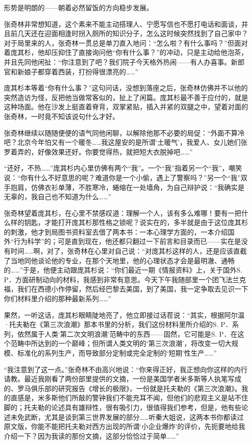 \par 形势是明朗的——朝着必然留饭的方向稳步发展。
\par 张奇林非常想知道，这个素来不能主动搭理人、宁愿写信也不愿打电话和面谈，并且前几天还在迎面相逢时拐入厕所的知识分子，怎么这时候突然找到了自己家中？对于局里来的人，张奇林一贯总是单刀直入地问：“怎么啦？有什么事吗？”但面对着庞其杉，他却压抑住了直接询问他“你有什么事？”的冲动，只是主动给他泡茶，并且先同他闲扯：“你注意到了吧？我们院子今天格外热闹——有人办喜事。新郎官和新娘子都穿着西装，打扮得很漂亮的……”
\par 庞其杉本等着“你有什么事？”这句问话，没想到落座之后，张奇林仿佛并不以他的突然造访为怪，反把他当做常客似的，扯上了闲篇。庞其杉最不善于应付的，就是这种场面。他在沙发上挺直着脊背，双掌紧贴，插入并紧的双腿之中，望着对面的张奇林，一时竟不知该说句什么才好。
\par 张奇林继续以随随便便的语气同他闲聊，以解除他那不必要的局促：“外面不算冷吧？北京今年怕又有一个暖冬……我这屋安的是所谓‘土暖气’，我爱人、女儿她们张罗着弄的，好像效果还好。你要觉得热，就把短大衣脱掉吧……”
\par “还好，不热……”庞其杉内心里仿佛有两个“我”。一个“我”指着另一个“我”，嘲笑说：“你有什么不好意思的呢？难道你是一个小偷，遇上了警察吗？”另一个“我”双手抱肩，仿佛衣衫单薄，不胜寒冷，蜷缩在一处墙角，为自己辩护说：“我确实是无辜的，我自己也不知道为什么……”
\par 张奇林望着庞其杉，在心里不禁感叹道：理解一个人，该有多么难哪！要有一把什么样的钥匙，才能打开庞其杉那性格之锁呢？说实在的，多半就是由于这位庞其杉的刺激，他才到局图书资料室去借了两本书：一本心理学方面的，一本介绍国外“行为科学”的；可是直到现在，他还都只翻过一下前言和目录而已——实在是没有时间……啊，对了，张奇林在心里对自己说：“对庞其杉这样的人，还是应该直截了当地同他谈论他的专业，在那个天地里，他的心理状态才会是最明澈、通畅的……”于是，他便主动跟庞其杉说：“你们最近一期《情报资料》上，关于国外S. P．方面研制动向的材料，我感到非常有意思。今天下午我随部里一个团飞法兰克福，我们在西德小作停留，然后经巴黎去美国，到了美国，我一定争取去见识一下你们材料里介绍的那种最新系列……”
\par 果然，一听这话，庞其杉眼睛陡地亮了，他立即接过话茬说：“其实，根据阿尔温·托夫勒在《第三次浪潮》那本书里的分析，我们这份材料里所介绍的S. P．系列，依然属于人类‘第二次文明浪潮’范畴中的东西——固然，它可能是S. P．在这个范畴中所达到的一个巅峰；但所谓人类文明的‘第三次浪潮’，将改变一切大规模、标准化的系列生产，而导致部分定制或完全定制的‘短期’性生产……”
\par “我注意到了这一点。”张奇林不由高兴地说：“你来得正好，我正想向你这样的内行请教。最近我刚看了两份部里提供的文摘，一份是美国学者米多斯等人执笔写成的、罗马俱乐部的研究报告《增长的极限》，一份就是托夫勒的《第三次浪潮》。我的直感是，米多斯他们所敲的警钟我们不能充耳不闻，但他们的悲观主义是站不住脚的；托夫勒的论述具有雄辩性，很有吸引力，很值得我们参考，但是，他有些论述未免武断，尤其是谈到第三世界发展的部分……听秦大姐说，这两本书你都读过原文版，你能不能把托夫勒对西方出现的所谓‘小企业爆炸’的评价，先扼要地给我介绍一下？因为我读的那份文摘，这部分恰恰过于简单……”
